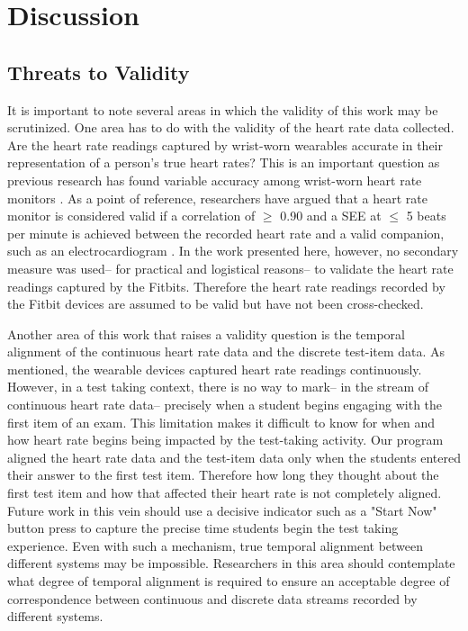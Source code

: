 \section{Discussion}
\subsection{Threats to Validity}
It is important to note several areas in which the validity of this work may be scrutinized. One area has to do with the validity of the heart rate data collected. Are the heart rate readings captured by wrist-worn wearables accurate in their representation of a person's true heart rates? This is an important question as previous research has found variable accuracy among wrist-worn heart rate monitors \cite{wang2017}. As a point of reference, researchers have argued that a heart rate monitor is considered valid if a correlation of $\geq$ 0.90 and a SEE at $\leq$ 5 beats per minute is achieved between the recorded heart rate and a valid companion, such as an electrocardiogram \cite{terbizan2002,leger1988}. In the work presented here, however, no secondary measure was used-- for practical and logistical reasons-- to validate the heart rate readings captured by the Fitbits. Therefore the heart rate readings recorded by the Fitbit devices are assumed to be valid but have not been cross-checked.  

Another area of this work that raises a validity question is the temporal alignment of the continuous heart rate data and the discrete test-item data. As mentioned, the wearable devices captured heart rate readings continuously. However, in a test taking context, there is no way to mark-- in the stream of continuous heart rate data-- precisely when a student begins engaging with the first item of an exam. This limitation makes it difficult to know for when and how heart rate begins being impacted by the test-taking activity. Our program aligned the heart rate data and the test-item data only when the students entered their answer to the first test item. Therefore how long they thought about the first test item and how that affected their heart rate is not completely aligned. Future work in this vein should use a decisive indicator such as a "Start Now" button press to capture the precise time students begin the test taking experience. Even with such a mechanism, true temporal alignment between different systems may be impossible. Researchers in this area should contemplate what degree of temporal alignment is required to ensure an acceptable degree of correspondence between continuous and discrete data streams recorded by different systems.

